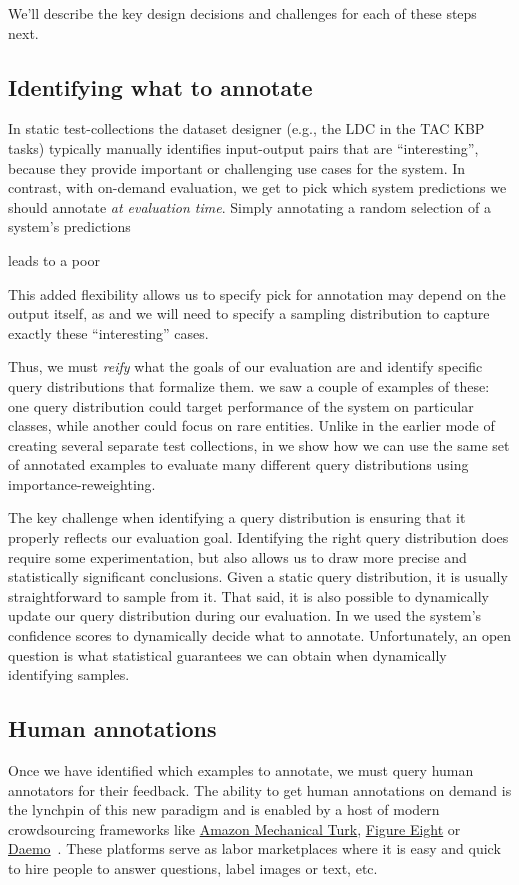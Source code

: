 We'll describe the key design decisions and challenges for each of these steps next.

\subsection{Identifying what to annotate}

In static test-collections the dataset designer (e.g., the LDC in the TAC KBP tasks) typically manually identifies input-output pairs that are ``interesting'', because they provide important or challenging use cases for the system.
In contrast, with on-demand evaluation, we get to pick which system predictions we should annotate \textit{at evaluation time}.
Simply annotating a random selection of a system's predictions 

leads to a poor 

This added flexibility allows us to specify 
pick for annotation may depend on the output itself, as  and we will need to specify a sampling distribution to capture exactly these ``interesting'' cases.



Thus, we must \textit{reify} what the goals of our evaluation are and identify specific query distributions that formalize them.
 we saw a couple of examples of these: one query distribution could target performance of the system on particular classes, while another could focus on rare entities.
Unlike in the earlier mode of creating several separate test collections, in  we show how we can use the same set of annotated examples to evaluate many different query distributions using importance-reweighting.

The key challenge when identifying a query distribution is ensuring that it properly reflects our evaluation goal.
Identifying the right query distribution does require some experimentation, but also allows us to draw more precise and statistically significant conclusions.
Given a static query distribution, it is usually straightforward to sample from it.
That said, it is also possible to dynamically update our query distribution during our evaluation.
In  we used the system's confidence scores to dynamically decide what to annotate.
Unfortunately, an open question is what statistical guarantees we can obtain when dynamically identifying samples.

\subsection{Human annotations}
Once we have identified which examples to annotate, we must query human annotators for their feedback.
The ability to get human annotations on demand is the lynchpin of this new paradigm and is enabled by a host of modern crowdsourcing frameworks like \href{requester.mturk.com}{Amazon Mechanical Turk}, \href{https://www.figure-eight.com/}{Figure Eight} or \href{https://daemo.org}{Daemo}~\citep{gaikwad2015daemo}.
These platforms serve as labor marketplaces where it is easy and quick to hire people to answer questions, label images or text, etc.

